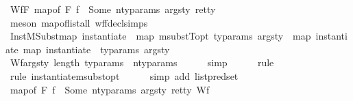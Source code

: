 \begin{isabellebody}
\ Wf{\isacharunderscore}{\kern0pt}F\ {\isacartoucheopen}map{\isacharunderscore}{\kern0pt}of\ F\ f\ {\isacharequal}{\kern0pt}\ Some\ {\isacharparenleft}{\kern0pt}n{\isacharunderscore}{\kern0pt}ty{\isacharunderscore}{\kern0pt}params{\isacharcomma}{\kern0pt}\ args{\isacharunderscore}{\kern0pt}ty{\isacharcomma}{\kern0pt}\ ret{\isacharunderscore}{\kern0pt}ty{\isacharparenright}{\kern0pt}{\isacartoucheclose}\isanewline
\ \ \ \ \isamarkupfalse%
\ {\isacharparenleft}{\kern0pt}meson\ map{\isacharunderscore}{\kern0pt}of{\isacharunderscore}{\kern0pt}list{\isacharunderscore}{\kern0pt}all\ wf{\isacharunderscore}{\kern0pt}fdecl{\isachardot}{\kern0pt}simps{\isacharparenright}{\kern0pt}\ \ \ \isanewline
\ \ \isamarkupfalse%
\ InstMSubst{\isacharcolon}{\kern0pt}{\isachardoublequoteopen}{\isacharparenleft}{\kern0pt}map\ {\isacharparenleft}{\kern0pt}instantiate\ {\isasymOmega}{\isacharparenright}{\kern0pt}\ {\isacharparenleft}{\kern0pt}map\ {\isacharparenleft}{\kern0pt}msubstT{\isacharunderscore}{\kern0pt}opt\ ty{\isacharunderscore}{\kern0pt}params{\isacharparenright}{\kern0pt}\ args{\isacharunderscore}{\kern0pt}ty{\isacharparenright}{\kern0pt}{\isacharparenright}{\kern0pt}\ {\isacharequal}{\kern0pt}\ map\ {\isacharparenleft}{\kern0pt}instantiate\ {\isacharparenleft}{\kern0pt}map\ {\isacharparenleft}{\kern0pt}instantiate\ {\isasymOmega}{\isacharparenright}{\kern0pt}\ ty{\isacharunderscore}{\kern0pt}params{\isacharparenright}{\kern0pt}{\isacharparenright}{\kern0pt}\ args{\isacharunderscore}{\kern0pt}ty{\isachardoublequoteclose}\isanewline
\ \ \ \ \isamarkupfalse%
\ Wf{\isacharunderscore}{\kern0pt}args{\isacharunderscore}{\kern0pt}ty\ {\isacartoucheopen}length\ ty{\isacharunderscore}{\kern0pt}params\ {\isacharequal}{\kern0pt}\ n{\isacharunderscore}{\kern0pt}ty{\isacharunderscore}{\kern0pt}params{\isacartoucheclose}\isanewline
\ \ \ \ \isamarkupfalse%
\ simp\isanewline
\ \ \ \ \isamarkupfalse%
\ rule\isanewline
\ \ \ \ \isamarkupfalse%
\ {\isacharparenleft}{\kern0pt}rule\ instantiate{\isacharunderscore}{\kern0pt}msubst{\isacharunderscore}{\kern0pt}opt{\isacharparenright}{\kern0pt}\isanewline
\ \ \ \ \isamarkupfalse%
\ {\isacharparenleft}{\kern0pt}simp\ add{\isacharcolon}{\kern0pt}\ list{\isachardot}{\kern0pt}pred{\isacharunderscore}{\kern0pt}set{\isacharparenright}{\kern0pt}\isanewline
\ \ \isamarkupfalse%
\ {\isacartoucheopen}map{\isacharunderscore}{\kern0pt}of\ F\ f\ {\isacharequal}{\kern0pt}\ Some\ {\isacharparenleft}{\kern0pt}n{\isacharunderscore}{\kern0pt}ty{\isacharunderscore}{\kern0pt}params{\isacharcomma}{\kern0pt}\ args{\isacharunderscore}{\kern0pt}ty{\isacharcomma}{\kern0pt}\ ret{\isacharunderscore}{\kern0pt}ty{\isacharparenright}{\kern0pt}{\isacartoucheclose}\ Wf{\isacharunderscore}{\kern0pt}{\isasymGamma}\ \isamarkupfalse%

\end{isabellebody}

